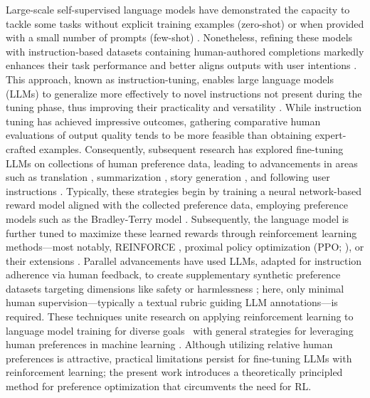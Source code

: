 Large-scale self-supervised language models have demonstrated the capacity to tackle some tasks without explicit training examples (zero-shot) \citep{radford2019language} or when provided with a small number of prompts (few-shot) \citep{gpt3,megatron,chowdhery2022palm}. Nonetheless, refining these models with instruction-based datasets containing human-authored completions markedly enhances their task performance and better aligns outputs with user intentions \citep{mishra-etal-2022-cross,sanh2022multitask,chung2022scaling,thoppilan2022lamda}. This approach, known as instruction-tuning, enables large language models (LLMs) to generalize more effectively to novel instructions not present during the tuning phase, thus improving their practicality and versatility \citep{chung2022scaling}. While instruction tuning has achieved impressive outcomes, gathering comparative human evaluations of output quality tends to be more feasible than obtaining expert-crafted examples. Consequently, subsequent research has explored fine-tuning LLMs on collections of human preference data, leading to advancements in areas such as translation \citep{kreutzer-etal-2018-reliability}, summarization \citep{stiennon2022learning,ziegler2020finetuning}, story generation \citep{ziegler2020finetuning}, and following user instructions \citep{ouyang2022training,ramamurthy2023is}. Typically, these strategies begin by training a neural network-based reward model aligned with the collected preference data, employing preference models such as the Bradley-Terry model \citep{bradley1952rankanalysis}. Subsequently, the language model is further tuned to maximize these learned rewards through reinforcement learning methods—most notably, REINFORCE \citep{williams1992reinforce}, proximal policy optimization (PPO; \cite{schulman2017proximal}), or their extensions \citep{ramamurthy2023is}. Parallel advancements have used LLMs, adapted for instruction adherence via human feedback, to create supplementary synthetic preference datasets targeting dimensions like safety or harmlessness \citep{bai2022constitutional}; here, only minimal human supervision—typically a textual rubric guiding LLM annotations—is required. These techniques unite research on applying reinforcement learning to language model training for diverse goals~\citep{Ranzato2015SequenceLT,paulus2018a,wu2018learning} with general strategies for leveraging human preferences in machine learning \citep{christiano2017deep,kupcsik2018learning}. Although utilizing relative human preferences is attractive, practical limitations persist for fine-tuning LLMs with reinforcement learning; the present work introduces a theoretically principled method for preference optimization that circumvents the need for RL.

